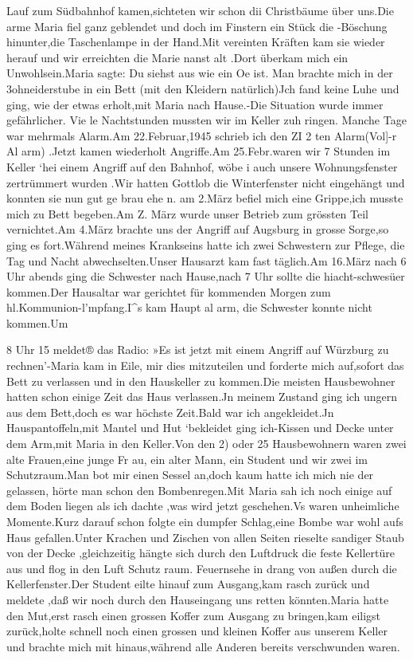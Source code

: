 \documentclass[a4paper,11pt]{article}
\begin{document}
Lauf zum Südbahnhof kamen,sichteten wir schon dii Christbäume über uns.Die arme Maria fiel ganz geblendet und doch im Finstern ein Stück die -Böschung hinunter,die Taschenlampe in der Hand.Mit vereinten Kräften kam sie wieder herauf und wir erreichten die Marie nanst alt .Dort überkam mich ein Unwohlsein.Maria sagte: Du siehst aus wie ein Oe ist. Man brachte mich in der 3ohneiderstube in ein Bett (mit den Kleidern natürlich)Jch fand keine Luhe und ging, wie der etwas erholt,mit Maria nach Hause.-Die Situation wurde immer gefährlicher. Vie le Nachtstunden mussten wir im Keller zuh ringen. Manche Tage war mehrmals Alarm.Am 22.Februar,1945 schrieb ich den ZI 2 ten Alarm(Vol]-r Al arm) .Jetzt kamen wiederholt Angriffe.Am 25.Febr.waren wir 7 Stunden im Keller ‘hei einem Angriff auf den Bahnhof, wöbe i auch unsere Wohnungsfenster zertrümmert wurden .Wir hatten Gottlob die Winterfenster nicht eingehängt und konnten sie nun gut ge brau ehe n. am 2.März befiel mich eine Grippe,ich musste mich zu Bett begeben.Am Z. März wurde unser Betrieb zum grössten Teil vernichtet.Am 4.März brachte uns der Angriff auf Augsburg in grosse Sorge,so ging es fort.Während meines Krankseins hatte ich zwei Schwestern zur Pflege, die Tag und Nacht abwechselten.Unser Hausarzt kam fast täglich.Am 16.März nach 6 Uhr abends ging die Schwester nach Hause,nach 7 Uhr sollte die hiacht-schwesüer kommen.Der Hausaltar war gerichtet für kommenden Morgen zum hl.Kommunion-l'mpfang.I^s kam Haupt al arm, die Schwester konnte nicht kommen.Um

8 Uhr 15 meldet® das Radio: »Es ist jetzt mit einem Angriff auf Würzburg zu rechnen’-Maria kam in Eile, mir dies mitzuteilen und forderte mich auf,sofort das Bett zu verlassen und in den Hauskeller zu kommen.Die meisten Hausbewohner hatten schon einige Zeit das Haus verlassen.Jn meinem Zustand ging ich ungern aus dem Bett,doch es war höchste Zeit.Bald war ich angekleidet.Jn Hauspantoffeln,mit Mantel und Hut ‘bekleidet ging ich-Kissen und Decke unter dem Arm,mit Maria in den Keller.Von den 2) oder 25 Hausbewohnern waren zwei alte Frauen,eine junge Fr au, ein alter Mann, ein Student und wir zwei im Schutzraum.Man bot mir einen Sessel an,doch kaum hatte ich mich nie der gelassen, hörte man schon den Bombenregen.Mit Maria sah ich noch einige auf dem Boden liegen als ich dachte ,was wird jetzt geschehen.Vs waren unheimliche Momente.Kurz darauf schon folgte ein dumpfer Schlag,eine Bombe war wohl aufs Haus gefallen.Unter Krachen und Zischen von allen Seiten rieselte sandiger Staub von der Decke ,gleichzeitig hängte sich durch den Luftdruck die feste Kellertüre aus und flog in den Luft Schutz raum. Feuernsehe in drang von außen durch die Kellerfenster.Der Student eilte hinauf zum Ausgang,kam rasch zurück und meldete ,daß wir noch durch den Hauseingang uns retten könnten.Maria hatte den Mut,erst rasch einen grossen Koffer zum Ausgang zu bringen,kam eiligst zurück,holte schnell noch einen grossen und kleinen Koffer aus unserem Keller und brachte mich mit hinaus,während alle Anderen bereits verschwunden waren.
\end{document}
